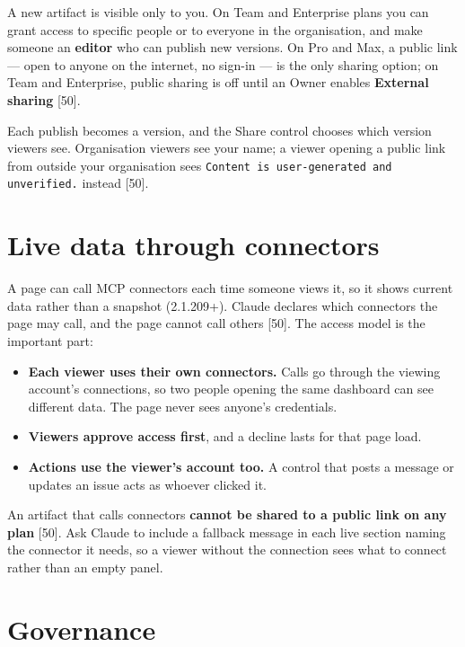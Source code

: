 \documentclass[11pt,a4paper,twoside,openany]{book}
\begin{document}
A new artifact is visible only to you. On Team and Enterprise plans you can grant access to specific people or to everyone in the organisation, and make someone an \textbf{editor} who can publish new versions. On Pro and Max, a public link — open to anyone on the internet, no sign-in — is the only sharing option; on Team and Enterprise, public sharing is off until an Owner enables \textbf{External sharing} [50].


Each publish becomes a version, and the Share control chooses which version viewers see. Organisation viewers see your name; a viewer opening a public link from outside your organisation sees \texttt{Content is \allowbreak{}user-\allowbreak{}generated a\allowbreak{}nd unverifi\allowbreak{}ed.\allowbreak{}} instead [50].


\FloatBarrier
\setcounter{section}{2}
\section{Live data through connectors}

A page can call MCP connectors each time someone views it, so it shows current data rather than a snapshot (2.1.209+). Claude declares which connectors the page may call, and the page cannot call others [50]. The access model is the important part:


\begin{itemize}
\item \textbf{Each viewer uses their own connectors.} Calls go through the viewing account's connections, so two people opening the same dashboard can see different data. The page never sees anyone's credentials.
\item \textbf{Viewers approve access first}, and a decline lasts for that page load.
\item \textbf{Actions use the viewer's account too.} A control that posts a message or updates an issue acts as whoever clicked it.
\end{itemize}

An artifact that calls connectors \textbf{cannot be shared to a public link on any plan} [50]. Ask Claude to include a fallback message in each live section naming the connector it needs, so a viewer without the connection sees what to connect rather than an empty panel.


\FloatBarrier
\setcounter{section}{3}
\section{Governance}
\end{document}
